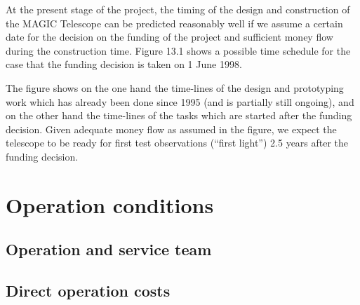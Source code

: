 \medskip {}

\medskip
At the present stage of the project,
the timing of the design and construction of the MAGIC Telescope
can be predicted reasonably well if we assume a certain date for the
decision on the funding of the project and sufficient money flow during
the construction time. Figure 13.1 shows a possible
time schedule for the case that the funding decision is taken
on 1 June 1998. 

The figure shows on the one hand the time-lines of the
design and prototyping work which has already been done since 1995 
(and is partially still ongoing), and on the other
hand the time-lines of the tasks which are started after the funding 
decision. Given adequate money flow as assumed in the figure,
we expect the telescope to be ready for first test observations 
(``first light'') 2.5 years after the funding decision.
%
\newpage
%
%
\thispagestyle{empty}
%
\begin{figure}[p]
%
%
\leavevmode
\centering
\vspace{-1cm}
\epsfxsize=18cm
\label{fig-timesched}
\end{figure}
\cleardoublepage


                      

\setcounter{chapter}{13}

\chapter{Operation conditions}

\section{Operation and service team}

\section{Direct operation costs}


